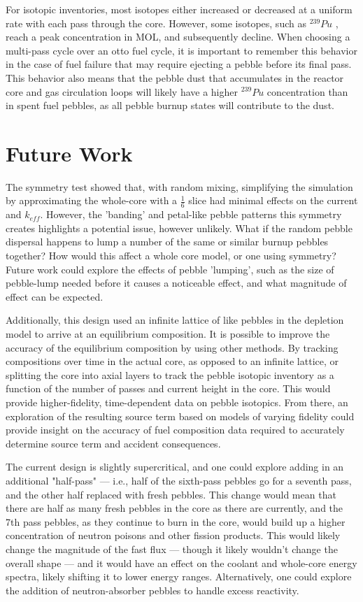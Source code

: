 For isotopic inventories, most isotopes either increased or decreased at a uniform rate with each pass through the core.  However, some isotopes, such as $^{239}Pu$ , reach a peak concentration in MOL, and subsequently decline.  When choosing a multi-pass cycle over an \acrfull{otto} fuel cycle, it is important to remember this behavior in the case of fuel failure that may require ejecting a pebble before its final pass.  This behavior also means that the pebble dust that accumulates in the reactor core and gas circulation loops will likely have a higher $^{239}Pu$ concentration than in spent fuel pebbles, as all pebble burnup states will contribute to the dust.


\section{Future Work}

The symmetry test showed that, with random mixing, simplifying the simulation by approximating the whole-core with a $\frac{1}{6}$ slice had minimal effects on the current and $k_{eff}$.  However, the 'banding' and petal-like pebble patterns this symmetry creates highlights a potential issue, however unlikely.  What if the random pebble dispersal happens to lump a number of the same or similar burnup pebbles together?  How would this affect a whole core model, or one using symmetry?  Future work could explore the effects of pebble 'lumping', such as the size of pebble-lump needed before it causes a noticeable effect, and what magnitude of effect can be expected.

Additionally, this design used an infinite lattice of like pebbles in the depletion model to arrive at an equilibrium composition.  It is possible to improve the accuracy of the equilibrium composition by using other methods.  By tracking compositions over time in the actual core, as opposed to an infinite lattice, or splitting the core into axial layers to track the pebble isotopic inventory as a function of the number of passes and current height in the core.  This would provide higher-fidelity, time-dependent data on pebble isotopics.  From there, an exploration of the resulting source term based on models of varying fidelity could provide insight on the accuracy of fuel composition data required to accurately determine source term and accident consequences.

The current design is slightly supercritical, and one could explore adding in an additional "half-pass" --- i.e., half of the sixth-pass pebbles go for a seventh pass, and the other half replaced with fresh pebbles.  This change would mean that there are half as many fresh pebbles in the core as there are currently, and the 7th pass pebbles, as they continue to burn in the core, would build up a higher concentration of neutron poisons and other fission products.  This would likely change the magnitude of the fast flux --- though it likely wouldn't change the overall shape --- and it would have an effect on the coolant and whole-core energy spectra, likely shifting it to lower energy ranges.  Alternatively, one could explore the addition of neutron-absorber pebbles to handle excess reactivity.

